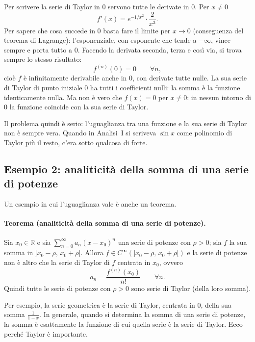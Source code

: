 Per scrivere la serie di Taylor in $0$ servono tutte le derivate in $0$. Per $x\neq 0$
\[
  f'(x) = e^{-1/x^2}\cdot \frac{2}{x^3} .
\]
Per sapere che cosa succede in $0$ basta fare il limite per $x\to0$ (conseguenza del teorema di Lagrange):
l'esponenziale, con esponente che tende a $-\infty$, vince sempre e porta tutto a $0$. Facendo la derivata
seconda, terza e così via, si trova sempre lo stesso risultato:
\[
  f^{(n)}(0) = 0 \qquad \forall n ,
\]
cioè $f$ è infinitamente derivabile anche in $0$, con derivate tutte nulle. La sua serie di Taylor di punto
iniziale $0$ ha tutti i coefficienti nulli: la somma è la funzione identicamente nulla. Ma non è vero che
$f(x)=0$ per $x\neq0$: in nessun intorno di $0$ la funzione coincide con la sua serie di Taylor.

Il problema quindi è serio: l'uguaglianza tra una funzione e la sua serie di Taylor non è sempre vera. Quando
in Analisi~I si scriveva $\sin x$ come polinomio di Taylor più il resto, c'era sotto qualcosa di forte.

\subsection{Esempio 2: analiticità della somma di una serie di potenze}

Un esempio in cui l'uguaglianza vale è anche un teorema.

\paragraph{Teorema (analiticità della somma di una serie di potenze).}
Sia $x_0\in\mathbb{R}$ e sia $\sum_{n=0}^{\infty} a_n (x-x_0)^n$ una serie di potenze con $\rho>0$; sia $f$ la sua
somma in $]x_0-\rho,\,x_0+\rho[$. Allora $f\in C^\infty(]x_0-\rho,\,x_0+\rho[)$ e la serie di potenze non è altro
che la serie di Taylor di $f$ centrata in $x_0$, ovvero
\[
  a_n = \frac{f^{(n)}(x_0)}{n!} \qquad \forall n .
\]
Quindi tutte le serie di potenze con $\rho>0$ sono serie di Taylor (della loro somma).

Per esempio, la serie geometrica è la serie di Taylor, centrata in $0$, della sua somma $\frac{1}{1-x}$. In
generale, quando si determina la somma di una serie di potenze, la somma è esattamente la funzione di cui quella
serie è la serie di Taylor. Ecco perché Taylor è importante.

